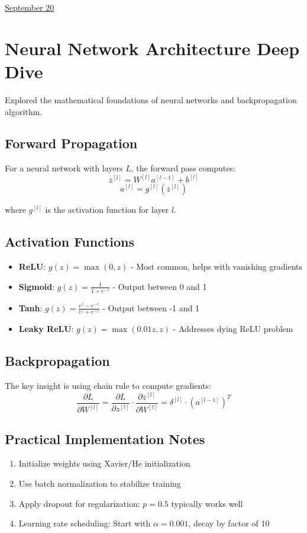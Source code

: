 \documentclass[11pt,letterpaper]{article}
\begin{document}
\href{run:2025-09-20-neural-networks.tex}{\Huge September 20} %

\section{Neural Network Architecture Deep Dive}

Explored the mathematical foundations of neural networks and backpropagation algorithm.

\subsection{Forward Propagation}
For a neural network with layers $L$, the forward pass computes:
$$z^{[l]} = W^{[l]} a^{[l-1]} + b^{[l]}$$
$$a^{[l]} = g^{[l]}(z^{[l]})$$

where $g^{[l]}$ is the activation function for layer $l$.

\subsection{Activation Functions}
\begin{itemize}
    \item \textbf{ReLU}: $g(z) = \max(0, z)$ - Most common, helps with vanishing gradients
    \item \textbf{Sigmoid}: $g(z) = \frac{1}{1 + e^{-z}}$ - Output between 0 and 1
    \item \textbf{Tanh}: $g(z) = \frac{e^z - e^{-z}}{e^z + e^{-z}}$ - Output between -1 and 1
    \item \textbf{Leaky ReLU}: $g(z) = \max(0.01z, z)$ - Addresses dying ReLU problem
\end{itemize}

\subsection{Backpropagation}
The key insight is using chain rule to compute gradients:
$$\frac{\partial L}{\partial W^{[l]}} = \frac{\partial L}{\partial z^{[l]}} \cdot \frac{\partial z^{[l]}}{\partial W^{[l]}} = \delta^{[l]} \cdot (a^{[l-1]})^T$$

\subsection{Practical Implementation Notes}
\begin{enumerate}
    \item Initialize weights using Xavier/He initialization
    \item Use batch normalization to stabilize training
    \item Apply dropout for regularization: $p = 0.5$ typically works well
    \item Learning rate scheduling: Start with $\alpha = 0.001$, decay by factor of 10
\end{enumerate}

 
\end{document}
